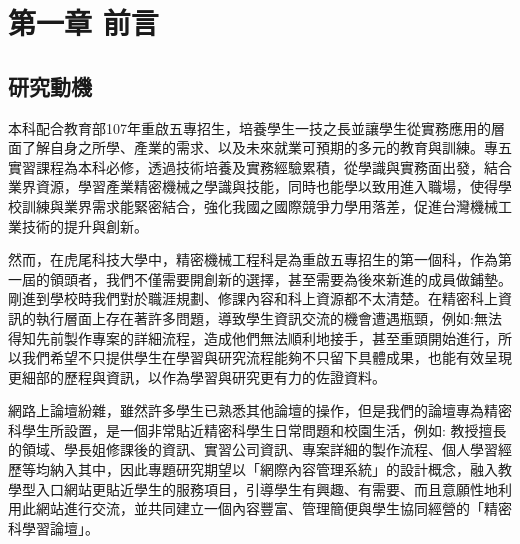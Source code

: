 \setcounter{chapter}{0}
\chapter{第一章 \quad 前言}
\renewcommand{\baselinestretch}{10} %
\section{研究動機}
\par
\renewcommand{\baselinestretch}{2} %
\fontsize{12pt}\baselineskip\selectfont\qquad 本科配合教育部107年重啟五專招生，培養學生一技之長並讓學生從實務應用的層面了解自身之所學、產業的需求、以及未來就業可預期的多元的教育與訓練。專五實習課程為本科必修，透過技術培養及實務經驗累積，從學識與實務面出發，結合業界資源，學習產業精密機械之學識與技能，同時也能學以致用進入職場，使得學校訓練與業界需求能緊密結合，強化我國之國際競爭力學用落差，促進台灣機械工業技術的提升與創新。\\
\par
\renewcommand{\baselinestretch}{1} %
\fontsize{12pt}\baselineskip\selectfont\hspace{0.5em} 然而，在虎尾科技大學中，精密機械工程科是為重啟五專招生的第一個科，作為第一屆的領頭者，我們不僅需要開創新的選擇，甚至需要為後來新進的成員做鋪墊。剛進到學校時我們對於職涯規劃、修課內容和科上資源都不太清楚。在精密科上資訊的執行層面上存在著許多問題，導致學生資訊交流的機會遭遇瓶頸，例如:無法得知先前製作專案的詳細流程，造成他們無法順利地接手，甚至重頭開始進行，所以我們希望不只提供學生在學習與研究流程能夠不只留下具體成果，也能有效呈現更細部的歷程與資訊，以作為學習與研究更有力的佐證資料。\\
\par
\renewcommand{\baselinestretch}{1} %
\fontsize{12pt}\baselineskip\selectfont\hspace{0.5em} 網路上論壇紛雜，雖然許多學生已熟悉其他論壇的操作，但是我們的論壇專為精密科學生所設置，是一個非常貼近精密科學生日常問題和校園生活，例如: 教授擅長的領域、學長姐修課後的資訊、實習公司資訊、專案詳細的製作流程、個人學習經歷等均納入其中，因此專題研究期望以「網際內容管理系統」的設計概念，融入教學型入口網站更貼近學生的服務項目，引導學生有興趣、有需要、而且意願性地利用此網站進行交流，並共同建立一個內容豐富、管理簡便與學生協同經營的「精密科學習論壇」。
\par

\renewcommand{\baselinestretch}{20} %
